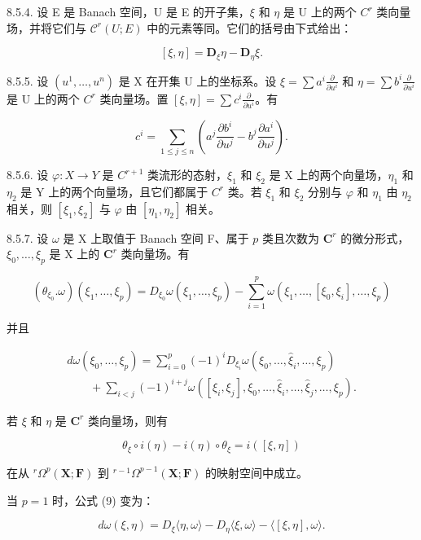 8.5.4. 设 E 是 Banach 空间，U 是 E 的开子集，\(\xi\) 和 \(\eta\) 是 U 上的两个 \(C^{r}\) 类向量场，并将它们与 \(\mathcal{C}^{r}(U;E)\) 中的元素等同。它们的括号由下式给出：

\[
[ \xi , \eta ] = \mathbf {D} _ {\xi} \eta - \mathbf {D} _ {\eta} \xi .\tag{6}
\]

8.5.5. 设 \((u^1, \ldots, u^n)\) 是 X 在开集 U 上的坐标系。设 \(\xi = \sum a^i \frac{\partial}{\partial u^i}\) 和 \(\eta = \sum b^i \frac{\partial}{\partial u^i}\) 是 U 上的两个 \(C^r\) 类向量场。置 \([\xi, \eta] = \sum c^i \frac{\partial}{\partial u^i}\)。有

\[
c ^ {i} = \sum_ {1 \leqslant j \leqslant n} \left(a ^ {j} \frac {\partial b ^ {i}}{\partial u ^ {j}} - b ^ {j} \frac {\partial a ^ {i}}{\partial u ^ {j}}\right).\tag{7}
\]

8.5.6. 设 \(\varphi: X \to Y\) 是 \(C^{r+1}\) 类流形的态射，\(\xi_1\) 和 \(\xi_2\) 是 X 上的两个向量场，\(\eta_{1}\) 和 \(\eta_{2}\) 是 Y 上的两个向量场，且它们都属于 \(C^r\) 类。若 \(\xi_{1}\) 和 \(\xi_{2}\) 分别与 \(\varphi\) 和 \(\eta_{1}\) 由 \(\eta_{2}\) 相关，则 \([\xi_{1}, \xi_{2}]\) 与 \(\varphi\) 由 \([\eta_{1}, \eta_{2}]\) 相关。

8.5.7. 设 \(\omega\) 是 X 上取值于 Banach 空间 F、属于 \(p\) 类且次数为 \(\mathbf{C}^r\) 的微分形式，\(\xi_0, \ldots, \xi_p\) 是 X 上的 \(\mathbf{C}^r\) 类向量场。有

\[
(\theta_ {\xi_ {0}}. \omega) (\xi_ {1}, \dots , \xi_ {p}) = D _ {\xi_ {0}} \omega (\xi_ {1}, \dots , \xi_ {p}) - \sum_ {i = 1} ^ {p} \omega (\xi_ {1}, \dots , [ \xi_ {0}, \xi_ {i} ], \dots , \xi_ {p})\tag{8}
\]

并且

\[
\begin{array}{l} d \omega (\xi_ {0}, \dots , \xi_ {p}) = \sum_ {i = 0} ^ {p} (- 1) ^ {i} D _ {\xi_ {i}} \omega (\xi_ {0}, \dots , \hat {\xi} _ {i}, \dots , \xi_ {p}) \\ \qquad + \sum_ {i <   j} (- 1) ^ {i + j} \omega ([ \xi_ {i}, \xi_ {j} ], \xi_ {0}, \dots , \hat {\xi} _ {i}, \dots , \hat {\xi} _ {j}, \dots , \xi_ {p}). \end{array}\tag{9}
\]

若 \(\xi\) 和 \(\eta\) 是 \(\mathbf{C}^r\) 类向量场，则有

\[
\theta_ {\xi} \circ i (\eta) - i (\eta) \circ \theta_ {\xi} = i ([ \xi , \eta ])\tag{10}
\]

在从 \(^{r}\Omega^{p}(\mathbf{X};\mathbf{F})\) 到 \(^{r-1}\Omega^{p-1}(\mathbf{X};\mathbf{F})\) 的映射空间中成立。

当 \(p = 1\) 时，公式 (9) 变为：

\[
d \omega (\xi , \eta) = D _ {\xi} \langle \eta , \omega \rangle - D _ {\eta} \langle \xi , \omega \rangle - \langle [ \xi , \eta ], \omega \rangle .\tag{11}
\]

